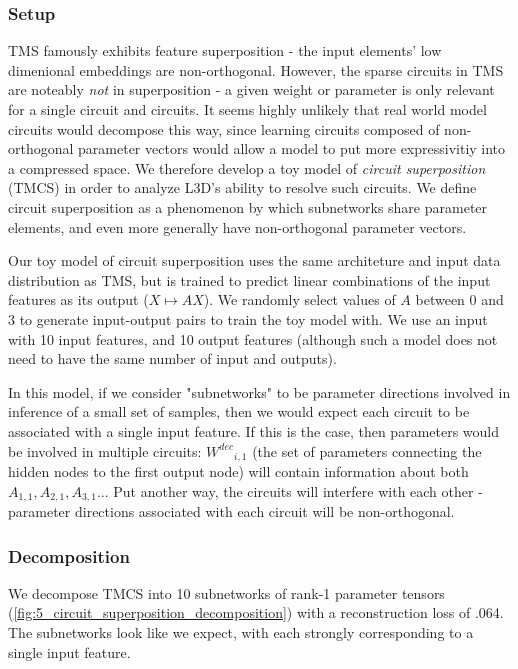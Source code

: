 \documentclass{article}
\theoremstyle{plain}
\theoremstyle{definition}
\theoremstyle{remark}
\begin{document}
\subsubsection{Setup}


TMS famously exhibits feature superposition - the input elements' low dimenional embeddings are non-orthogonal. However, the sparse circuits in TMS are noteably \textit{not} in superposition - a given weight or parameter is only relevant for a single circuit and circuits. It seems highly unlikely that real world model circuits would decompose this way, since learning circuits composed of non-orthogonal parameter vectors would allow a model to put more expressivitiy into a compressed space. We therefore develop a toy model of \textit{circuit superposition} (TMCS) in order to analyze L3D's ability to resolve such circuits. We define circuit superposition as a phenomenon by which subnetworks share parameter elements, and even more generally have non-orthogonal parameter vectors. 

Our toy model of circuit superposition uses the same architeture and input data distribution as TMS, but is trained to predict linear combinations of the input features as its output ($X \mapsto A X$). We randomly select values of $A$ between 0 and 3 to generate input-output pairs to train the toy model with. We use an input with 10 input features, and 10 output features (although such a model does not need to have the same number of input and outputs).

In this model, if we consider "subnetworks" to be parameter directions involved in inference of a small set of samples, then we would expect each circuit to be associated with a single input feature. If this is the case, then parameters would be involved in multiple circuits: ${W^{dec}}_{i,1}$ (the set of parameters connecting the hidden nodes to the first output node) will contain information about both $A_{1,1}, A_{2,1}, A_{3,1}...$  Put another way, the circuits will interfere with each other - parameter directions associated with each circuit will be non-orthogonal. 

\subsubsection{Decomposition}

We decompose TMCS into 10 subnetworks of rank-1 parameter tensors (\ref{fig:5_circuit_superposition_decomposition}) with a reconstruction loss of .064. The subnetworks look like we expect, with each strongly corresponding to a single input feature.
\end{document}
